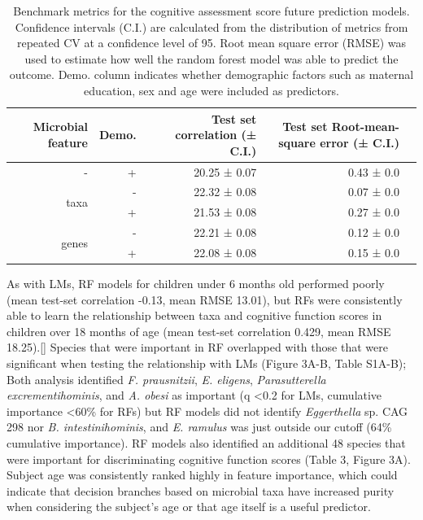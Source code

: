 \documentclass{article}
\begin{document}
\begin{table}[!h]
    \begin{center}
    \begin{tabular}{|r|r|r|r|r}
        \hline
        \textbf{Microbial feature} & \textbf{Demo.} & \textbf{Test set correlation (± C.I.)} & \textbf{Test set Root-mean-square error (± C.I.)} \\\hline
        - & + & 20.25 ± 0.07 & 0.43 ± 0.0 \\ \cline{1-4}
        \multirow{2}{*}{taxa} & - & 22.32 ± 0.08 & 0.07 ± 0.0 \\ \cline{2-4}
            & + & 21.53 ± 0.08 & 0.27 ± 0.0 \\ \cline{1-4}
        \multirow{2}{*}{genes} & - & 22.21 ± 0.08 & 0.12 ± 0.0 \\ \cline{2-4}
            & + & 22.08 ± 0.08 & 0.15 ± 0.0 \\\hline\hline
    \end{tabular}
    \caption{\label{tab:rfbench}Benchmark metrics for the cognitive assessment score
    future prediction models. Confidence intervals (C.I.) are calculated from the
    distribution of metrics from repeated CV at a confidence level of 95.
    Root mean square error (RMSE) was used to estimate how well the random forest model was able to predict the outcome.
    Demo. column indicates whether demographic factors such as maternal education, sex and age were included as predictors.}
    \end{center}
\end{table}

As with LMs, RF models for children under 6 months old
performed poorly (mean test-set correlation -0.13, mean RMSE 13.01),
but RFs were consistently able to learn the relationship between taxa
and cognitive function scores in children over 18 months of age (mean
test-set correlation 0.429, mean RMSE 18.25).[]
Species that were important in RF overlapped with those that were
significant when testing the relationship with LMs (Figure
3A-B, Table S1A-B); Both analysis identified 
\textit{F. prausnitzii}, %
\textit{E. eligens}, %
\textit{Parasutterella excrementihominis}, and %
\textit{A. obesi} as important %
(q \textless 0.2 for LMs, cumulative importance \textless 60\% for RFs)
but RF models did not identify \textit{Eggerthella} sp. CAG 298
nor \textit{B. intestinihominis}, and \textit{E. ramulus}
was just outside our cutoff (64\% cumulative importance).
RF models also identified an additional 48 species
that were important for discriminating cognitive function scores
(Table 3, Figure 3A). Subject age was consistently ranked highly in
feature importance, which could indicate that decision branches based on
microbial taxa have increased purity when considering the subject's age
or that age itself is a useful predictor.
\end{document}
